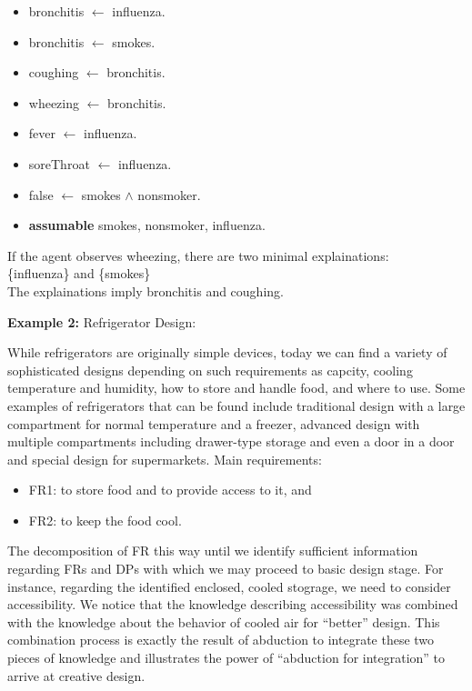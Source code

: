 \documentclass[12pt,twoside]{article}
\begin{document}
\begin{exercises}
\begin{itemize}
  \setlength{\parskip}{0pt}
  \item bronchitis $\leftarrow$ influenza.
  \item bronchitis $\leftarrow$ smokes.
  \item coughing $\leftarrow$ bronchitis.
  \item wheezing $\leftarrow$ bronchitis.
  \item fever $\leftarrow$ influenza.
  \item soreThroat $\leftarrow$ influenza.
  \item false $\leftarrow$ smokes $\wedge$ nonsmoker.
  \item \textbf{assumable} smokes, nonsmoker, influenza.
\end{itemize}

If the agent observes wheezing, there are two minimal explainations: \\
\vspace{5em} \{influenza\} and \{smokes\} \\
The explainations imply bronchitis and coughing.

\textbf{Example 2:} Refrigerator Design:

While refrigerators are originally simple devices, today we can find a variety of sophisticated designs depending on such requirements as capcity, cooling temperature and humidity, how to store and handle food, and where to use. Some examples of refrigerators that can be found include traditional design with a large compartment for normal temperature and a freezer, advanced design with multiple compartments including drawer-type storage and even a door in a door and special design for supermarkets. Main requirements:
\begin{itemize}
  \item FR1: to store food and to provide access to it, and
  \item FR2: to keep the food cool. 
\end{itemize}

The decomposition of FR this way until we identify sufficient information regarding FRs and DPs with which we may proceed to basic design stage. For instance, regarding the identified enclosed, cooled stograge, we need to consider accessibility. We notice that the knowledge describing accessibility was combined with the knowledge about the behavior of cooled air for ``better'' design. This combination process is exactly the result of abduction to integrate these two pieces of knowledge and illustrates the power of ``abduction for integration'' to arrive at creative design.
\fi


\end{exercises}
\end{document}
